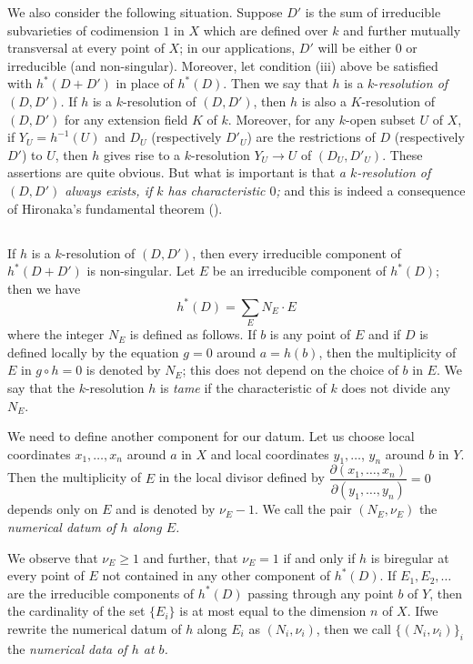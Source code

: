 We also consider the following situation. Suppose $D'$ is the sum of
irreducible subvarieties of codimension $1$ in $X$ which are defined
over $k$ and further mutually transversal at every point of $X$; in
our applications, $D'$ will be either $0$ or irreducible (and
non-singular). Moreover, let condition (iii) above be satisfied with
$h^{\ast}(D+D')$ in place of $h^{\ast}(D)$. Then we say that $h$ is a
$k$-{\em resolution of $(D,D')$.} If $h$ is a $k$-resolution of
$(D,D')$, then $h$ is also a $K$-resolution of $(D,D')$\pageoriginale
for any extension field $K$ of $k$. Moreover, for any $k$-open subset
$U$ of $X$, if $Y_{U}=h^{-1}(U)$ and $D_{U}$ (respectively $D'_{U}$)
are the restrictions of $D$ (respectively $D'$) to $U$, then $h$ gives
rise to a $k$-resolution $Y_{U}\to U$ of $(D_{U},D'_{U})$. These
assertions are quite obvious. But what is important is that {\em a
  $k$-resolution of $(D,D')$ always exists, if $k$ has characteristic
  $0$;} and this is indeed a consequence of Hironaka's fundamental
theorem (\cite{Hir}).

\subsection{}\label{chap3:sec2:subsec2}%

If $h$ is a $k$-resolution of $(D,D')$, then every irreducible
component of $h^{\ast}(D+D')$ is non-singular. Let $E$ be an
irreducible component of $h^{\ast}(D)$; then we have
$$
h^{\ast}(D)=\sum_{E}N_{E}\cdot E
$$
where the integer $N_{E}$ is defined as follows. If $b$ is any point
of $E$ and if $D$ is defined locally by the equation $g=0$ around
$a=h(b)$, then the multiplicity of $E$ in $g\circ h=0$ is denoted by
$N_{E}$; this does not depend on the choice of $b$ in $E$. We say that
the $k$-resolution $h$ is {\em tame} if the characteristic of $k$ does
not divide any $N_{E}$.

We need to define another component for our datum. Let us choose local
coordinates $x_{1},\ldots,x_{n}$ around $a$ in $X$ and local coordinates
$y_{1},\ldots$, $y_{n}$ around $b$ in $Y$. Then the multiplicity of $E$
in the local divisor defined by
$\dfrac{\partial(x_{1},\ldots,x_{n})}{\partial(y_{1},\ldots,y_{n})}=0$
depends only on $E$ and is denoted by $\nu_{E}-1$. We call the pair
$(N_{E},\nu_{E})$ the {\em numerical datum of $h$ along $E$.}

We observe that $\nu_{E}\geq 1$ and further, that $\nu_{E}=1$ if and
only if $h$ is biregular at every point of $E$ not contained in any
other component of $h^{\ast}(D)$. If $E_{1},E_{2},\ldots$ are the
irreducible components of $h^{\ast}(D)$ passing through any point $b$
of $Y$, then the cardinality of the set $\{E_{i}\}$ is at most equal
to the dimension $n$ of $X$. If\pageoriginale we rewrite the numerical
datum of $h$ along $E_{i}$ as $(N_{i},\nu_{i})$, then we call
$\{(N_{i},\nu_{i})\}_{i}$ the {\em numerical data of $h$ at $b$.}

